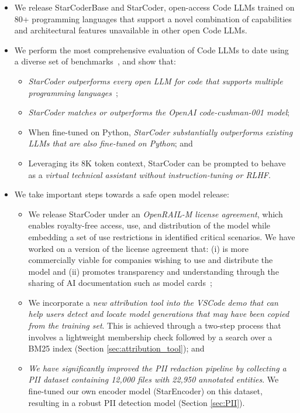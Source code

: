\begin{itemize}
    \item We release StarCoderBase and StarCoder, open-access Code LLMs trained on 80+ programming languages that support a novel combination of capabilities and architectural features unavailable in other open Code LLMs.
    \item We perform the most comprehensive evaluation of Code LLMs to date using a diverse set of benchmarks~\citep{Lai2022DS1000,cassano2022multiple,pearce2022copilotsec,fried2022incoder,yee:typeweaver,austin2021program,chen2021codex,bigcode-evaluation-harness,hendrycks2020mmlu,reddy2019coqa,cobbe2021training, nadeem_stereoset_2021,gehman_realtoxicityprompts_2020,liang2022helm}, and show that:
    \begin{itemize}
        \item \emph{StarCoder outperforms every open LLM for code that supports multiple programming languages}~\citep{nijkamp:codegen,qinkai:codegeex};
        \item \emph{StarCoder matches or outperforms the OpenAI code-cushman-001 model};
        \item When fine-tuned on Python, \emph{StarCoder substantially outperforms existing LLMs that are also fine-tuned on Python}; and
        \item Leveraging its 8K token context, StarCoder can be prompted to behave as a \emph{virtual technical assistant without instruction-tuning or RLHF}.
    \end{itemize}
    \item We take important steps towards a safe open model release: 
    \begin{itemize}
        \item We release StarCoder under an \emph{OpenRAIL-M license agreement}, which enables royalty-free access, use, and distribution of the model while embedding a set of use restrictions in identified critical scenarios. We have worked on a version of the license agreement that: (i) is more commercially viable for companies wishing to use and distribute the model and (ii) promotes transparency and understanding through the sharing of AI documentation such as model cards~\citep{mitchell2019modelcard};
        \item We incorporate a \emph{new attribution tool into the VSCode demo that can help users detect and locate model generations that may have been copied from the training set}. This is achieved through a two-step process that involves a lightweight membership check followed by a search over a BM25 index (Section \ref{sec:attribution_tool}); and 
        \item \emph{We have significantly improved the PII redaction pipeline by collecting a PII dataset containing 12,000 files with 22,950 annotated entities}. We fine-tuned our own encoder model (StarEncoder) on this dataset, resulting in a robust PII detection model (Section \ref{sec:PII}). 
    \end{itemize}
\end{itemize}